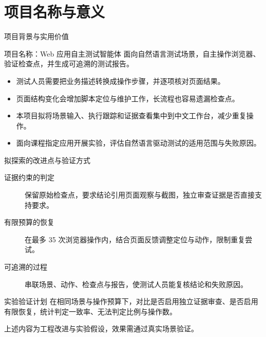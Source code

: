 \section{项目名称与意义}
\begin{frame}{项目背景与实用价值}
\begin{block}{项目名称：Web 应用自主测试智能体}
面向自然语言测试场景，自主操作浏览器、验证检查点，并生成可追溯的测试报告。
\end{block}
\begin{itemize}
\item 测试人员需要把业务描述转换成操作步骤，并逐项核对页面结果。
\item 页面结构变化会增加脚本定位与维护工作，长流程也容易遗漏检查点。
\item 本项目拟将场景输入、执行跟踪和证据查看集中到中文工作台，减少重复操作。
\item 面向课程指定应用开展实验，评估自然语言驱动测试的适用范围与失败原因。
\end{itemize}
\end{frame}

\begin{frame}{拟探索的改进点与验证方式}
\begin{description}
\item[证据约束的判定] 保留原始检查点，要求结论引用页面观察与截图，独立审查证据是否直接支持要求。
\item[有限预算的恢复] 在最多 35 次浏览器操作内，结合页面反馈调整定位与动作，限制重复尝试。
\item[可追溯的过程] 串联场景、动作、检查点与报告，使测试人员能复核结论和失败原因。
\end{description}
\begin{block}{实验验证计划}
在相同场景与操作预算下，对比是否启用独立证据审查、是否启用有限恢复，统计判定一致率、无法判定比例与操作数。
\end{block}
\small 上述内容为工程改进与实验假设，效果需通过真实场景验证。
\end{frame}
